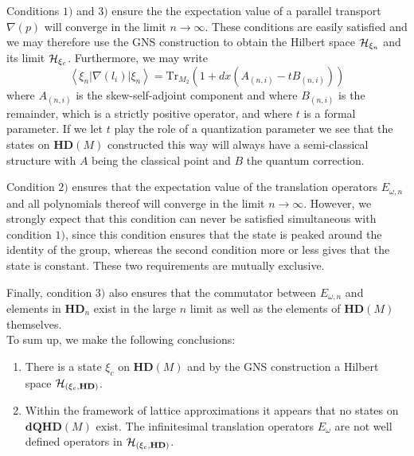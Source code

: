 \documentclass[12pt]{article}
\def\oo{\omega}
\def\ch{{\cal H}}
\begin{document}
%
Conditions $1)$ and $3)$ ensure the the expectation value of a parallel transport $\nabla(p)$ will converge in the limit $n\rightarrow\infty$. These conditions are easily satisfied and we may therefore use the GNS construction to obtain the Hilbert space $\ch_{\xi_n}$ and its limit $\ch_{\xi_c}$. Furthermore, we may write
\begin{equation}
\left\langle \xi_{n} \vert \nabla(l_i) \vert \xi_{n}\right\rangle = \mbox{Tr}_{M_2}\left( \mathrm{1} + dx \left(A_{(n,i)} - t B_{(n,i)}\right)\right)
\label{Ash}
\end{equation}
where $A_{(n,i)}$ is the skew-self-adjoint component and where $B_{(n,i)}$ is the remainder, which is a strictly positive operator, and where $t$ is a formal parameter. If we let $t$ play the role of a quantization parameter we see that the states on $\mathbf{HD}(M)$ constructed this way will always have a semi-classical structure with $A$ being the classical point and $B$ the quantum correction. %

Condition $2)$ ensures that the expectation value of the translation operators $E_{\oo,n}$ and all polynomials thereof will converge in the limit $n\rightarrow\infty$. However, we strongly expect that this condition can never be satisfied simultaneous with condition $1)$, since this condition ensures that the state is peaked around the identity of the group, whereas the second condition more or less gives that the state is constant. These two requirements are mutually exclusive.

Finally, condition $3)$ also ensures that the commutator between $E_{\oo,n}$ and elements in $\mathbf{HD}_n$ exist in the large $n$ limit as well as the elements of $\mathbf{HD}(M)$ themselves. 
 \\

To sum up, we make the following conclusions:
\begin{enumerate}
\item
There is a state $\xi_c$ on $\mathbf{HD}(M)$ and by the GNS construction a Hilbert space $\ch_{(\xi_c,\mathbf{HD})}$. %
\item
Within the framework of lattice approximations it appears that no states on $\mathbf{dQHD}(M)$ exist. The infinitesimal translation operators $E_\oo$ are not well defined operators in $\ch_{(\xi_c,\mathbf{HD})}$.
\end{enumerate}
\end{document}
